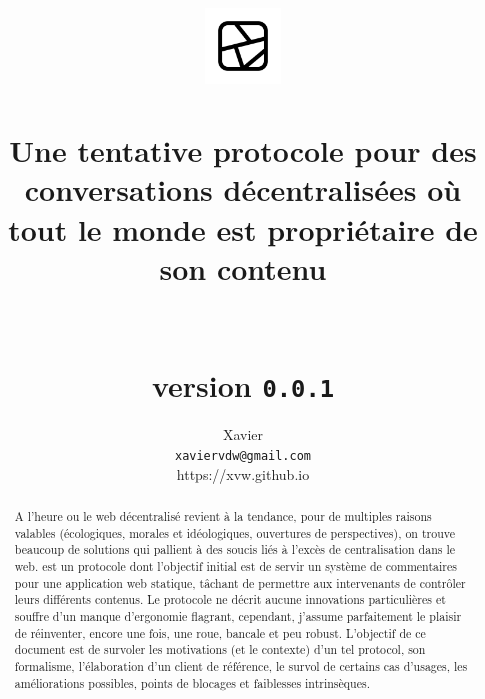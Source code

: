 \documentclass[a4paper,10pt]{article}
\title{
  \includegraphics[width=2cm]{../iconography/phragment-black.png}\\
  \bsc{Phragment}\\
  \large{
    Une tentative protocole pour des conversations décentralisées
    où tout le monde est propriétaire de son contenu\\~\\~\\
    \textbf{version} \texttt{0.0.1}
  }
}
\date{}
\author{
  Xavier \bsc{Van de Woestyne}\\
  \texttt{xaviervdw@gmail.com}\\
  \small{https://xvw.github.io}
}
\begin{document}
\maketitle

\begin{abstract}
  A l'heure ou le web décentralisé revient à la tendance, pour de multiples
  raisons valables (écologiques, morales et idéologiques, ouvertures de
  perspectives), on trouve beaucoup de solutions qui pallient à des soucis
  liés à l'excès de centralisation dans le web.  est un
  protocole dont l'objectif initial est de servir un système de commentaires
  pour une application web statique, tâchant de permettre aux intervenants
  de contrôler leurs différents contenus. Le protocole ne décrit aucune
  innovations particulières et souffre d'un manque d'ergonomie flagrant,
  cependant, j'assume parfaitement le plaisir de réinventer, encore une fois,
  une roue, bancale et peu robust. L'objectif de ce document est de survoler
  les motivations (et le contexte) d'un tel protocol, son formalisme,
  l'élaboration d'un client de référence, le survol de certains cas d'usages,
  les améliorations possibles, points de blocages et faiblesses intrinsèques.
\end{abstract}


\newpage


\end{document}
